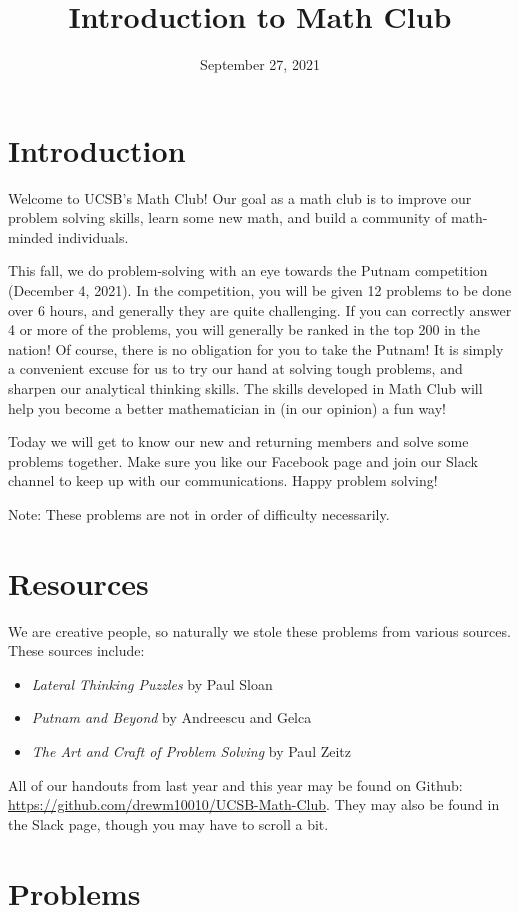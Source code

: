 \documentclass{article}
\title{Introduction to Math Club}
\author{}
\date{September 27, 2021}
\begin{document}
\section{Introduction}

    Welcome to UCSB's Math Club!
    Our goal as a math club is to improve our problem solving skills, learn some new math, and build a community of math-minded individuals.
    
    This fall, we do problem-solving with an eye towards the Putnam competition (December 4, 2021).
    In the competition, you will be given 12 problems to be done over 6 hours, and generally they are quite challenging. 
    If you can correctly answer 4 or more of the problems, you will generally be ranked in the top 200 in the nation!
    Of course, there is no obligation for you to take the Putnam! 
    It is simply a convenient excuse for us to try our hand at solving tough problems, and sharpen our analytical thinking skills. 
    The skills developed in Math Club will help you become a better mathematician in (in our opinion) a fun way!
    
    Today we will get to know our new and returning members and solve some problems together.
    Make sure you like our Facebook page and join our Slack channel to keep up with our communications.
    Happy problem solving!     
    
    Note: These problems are not in order of difficulty necessarily.

\section{Resources}

We are creative people, so naturally we stole these problems from various sources.
These sources include:
\begin{itemize}
    \item {\it Lateral Thinking Puzzles} by Paul Sloan
    \item {\it Putnam and Beyond} by Andreescu and Gelca
    \item {\it The Art and Craft of Problem Solving} by Paul Zeitz
\end{itemize}
All of our handouts from last year and this year may be found on Github: \url{https://github.com/drewm10010/UCSB-Math-Club}.
They may also be found in the Slack page, though you may have to scroll a bit.

\section{Problems}
\end{document}
